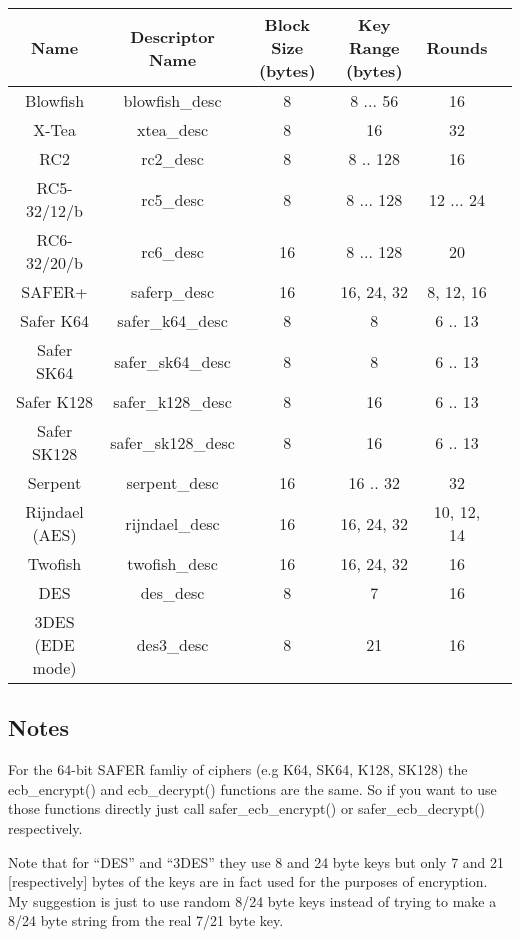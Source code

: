 \documentclass{book}
\begin{document}
\begin{small}
\begin{center}
\begin{tabular}{|c|c|c|c|c|c|}
     \hline Name & Descriptor Name & Block Size (bytes) & Key Range (bytes) & Rounds \\
     \hline Blowfish & blowfish\_desc & 8 & 8 ... 56 & 16 \\
     \hline X-Tea & xtea\_desc & 8 & 16 & 32 \\
     \hline RC2 & rc2\_desc & 8 & 8 .. 128 & 16 \\
     \hline RC5-32/12/b & rc5\_desc & 8 & 8 ... 128 & 12 ... 24 \\
     \hline RC6-32/20/b & rc6\_desc & 16 & 8 ... 128 & 20 \\
     \hline SAFER+ & saferp\_desc &16 & 16, 24, 32 & 8, 12, 16 \\
     \hline Safer K64   & safer\_k64\_desc & 8 & 8 & 6 .. 13 \\
     \hline Safer SK64  & safer\_sk64\_desc & 8 & 8 & 6 .. 13 \\
     \hline Safer K128  & safer\_k128\_desc & 8 & 16 & 6 .. 13 \\
     \hline Safer SK128 & safer\_sk128\_desc & 8 & 16 & 6 .. 13 \\
     \hline Serpent & serpent\_desc & 16 & 16 .. 32 & 32 \\
     \hline Rijndael (AES) & rijndael\_desc & 16 & 16, 24, 32 & 10, 12, 14 \\
     \hline Twofish & twofish\_desc & 16 & 16, 24, 32 & 16 \\
     \hline DES & des\_desc & 8 & 7 & 16 \\
     \hline 3DES (EDE mode) & des3\_desc & 8 & 21 & 16 \\
     \hline
\end{tabular}
\end{center}
\end{small}

\subsection{Notes}
For the 64-bit SAFER famliy of ciphers (e.g K64, SK64, K128, SK128) the ecb\_encrypt() and ecb\_decrypt()
functions are the same.  So if you want to use those functions directly just call safer\_ecb\_encrypt()
or safer\_ecb\_decrypt() respectively.

Note that for ``DES'' and ``3DES'' they use 8 and 24 byte keys but only 7 and 21 [respectively] bytes of the keys are in
fact used for the purposes of encryption.  My suggestion is just to use random 8/24 byte keys instead of trying to make a 8/24
byte string from the real 7/21 byte key.
\end{document}
